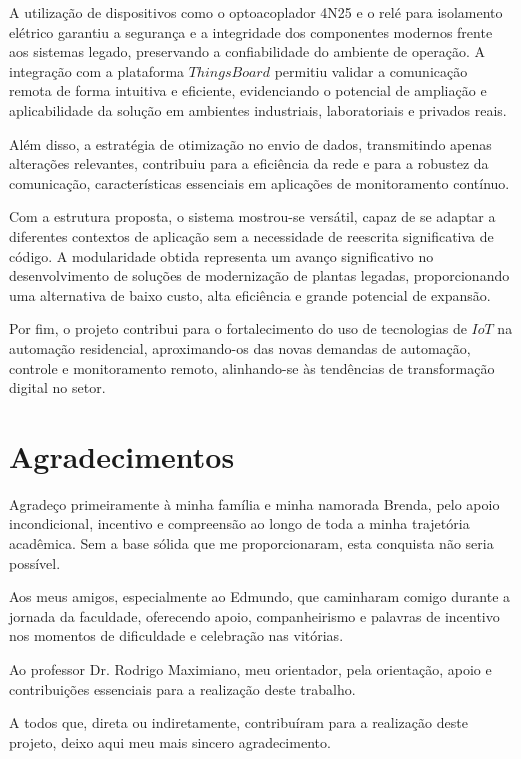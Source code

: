 \documentclass{ecatfg}
\begin{document}
A utilização de dispositivos como o optoacoplador 4N25 e o relé para isolamento elétrico garantiu a segurança e a integridade dos componentes modernos frente aos sistemas legado, preservando a confiabilidade do ambiente de operação. A integração com a plataforma $ThingsBoard$ permitiu validar a comunicação remota de forma intuitiva e eficiente, evidenciando o potencial de ampliação e aplicabilidade da solução em ambientes industriais, laboratoriais e privados reais.\par

Além disso, a estratégia de otimização no envio de dados, transmitindo apenas alterações relevantes, contribuiu para a eficiência da rede e para a robustez da comunicação, características essenciais em aplicações de monitoramento contínuo.\par

Com a estrutura proposta, o sistema mostrou-se versátil, capaz de se adaptar a diferentes contextos de aplicação sem a necessidade de reescrita significativa de código. A modularidade obtida representa um avanço significativo no desenvolvimento de soluções de modernização de plantas legadas, proporcionando uma alternativa de baixo custo, alta eficiência e grande potencial de expansão.\par

Por fim, o projeto contribui para o fortalecimento do uso de tecnologias de $IoT$ na automação residencial, aproximando-os das novas demandas de automação, controle e monitoramento remoto, alinhando-se às tendências de transformação digital no setor.\par
	
\section{Agradecimentos}
Agradeço primeiramente à minha família e minha namorada Brenda, pelo apoio incondicional, incentivo e compreensão ao longo de toda a minha trajetória acadêmica. Sem a base sólida que me proporcionaram, esta conquista não seria possível. \par

Aos meus amigos, especialmente ao Edmundo, que caminharam comigo durante a jornada da faculdade, oferecendo apoio, companheirismo e palavras de incentivo nos momentos de dificuldade e celebração nas vitórias. \par

Ao professor Dr. Rodrigo Maximiano, meu orientador, pela orientação, apoio e contribuições essenciais para a realização deste trabalho. \par

A todos que, direta ou indiretamente, contribuíram para a realização deste projeto, deixo aqui meu mais sincero agradecimento. \par
	




		
\end{document}
